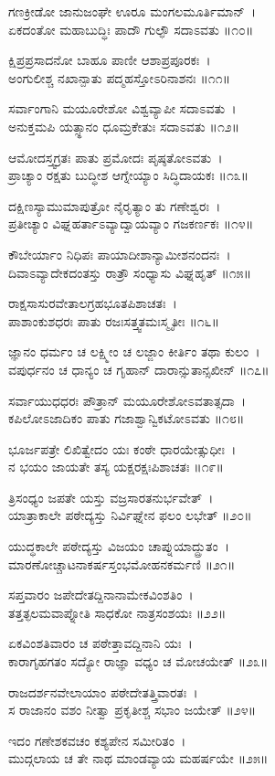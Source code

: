 ಗಣಕ್ರೀಡೋ ಜಾನುಜಂಘೇ ಊರೂ ಮಂಗಲಮೂರ್ತಿಮಾನ್~।\\
ಏಕದಂತೋ ಮಹಾಬುದ್ಧಿಃ ಪಾದೌ ಗುಲ್ಫೌ ಸದಾಽವತು ॥೧೦॥

ಕ್ಷಿಪ್ರಪ್ರಸಾದನೋ ಬಾಹೂ ಪಾಣೀ ಆಶಾಪ್ರಪೂರಕಃ~।\\
ಅಂಗುಲೀಶ್ಚ ನಖಾನ್ಪಾತು ಪದ್ಮಹಸ್ತೋಽರಿನಾಶನಃ ॥೧೧॥

ಸರ್ವಾಂಗಾನಿ ಮಯೂರೇಶೋ ವಿಶ್ವವ್ಯಾಪೀ ಸದಾಽವತು~।\\
ಅನುಕ್ತಮಪಿ ಯತ್ಸ್ಥಾನಂ ಧೂಮ್ರಕೇತುಃ ಸದಾಽವತು ॥೧೨॥

ಆಮೋದಸ್ತ್ವಗ್ರತಃ ಪಾತು ಪ್ರಮೋದಃ ಪೃಷ್ಠತೋಽವತು~।\\
ಪ್ರಾಚ್ಯಾಂ ರಕ್ಷತು ಬುದ್ಧೀಶ ಆಗ್ನೇಯ್ಯಾಂ ಸಿದ್ಧಿದಾಯಕಃ ॥೧೩॥

ದಕ್ಷಿಣಸ್ಯಾಮುಮಾಪುತ್ರೋ ನೈರೃತ್ಯಾಂ ತು ಗಣೇಶ್ವರಃ~।\\
ಪ್ರತೀಚ್ಯಾಂ ವಿಘ್ನಹರ್ತಾಽವ್ಯಾದ್ವಾಯವ್ಯಾಂ ಗಜಕರ್ಣಕಃ ॥೧೪॥

ಕೌಬೇರ್ಯಾಂ ನಿಧಿಪಃ ಪಾಯಾದೀಶಾನ್ಯಾಮೀಶನಂದನಃ~।\\
ದಿವಾಽವ್ಯಾದೇಕದಂತಸ್ತು ರಾತ್ರೌ ಸಂಧ್ಯಾಸು ವಿಘ್ನಹೃತ್ ॥೧೫॥

ರಾಕ್ಷಸಾಸುರವೇತಾಲಗ್ರಹಭೂತಪಿಶಾಚತಃ~।\\
ಪಾಶಾಂಕುಶಧರಃ ಪಾತು ರಜಃಸತ್ತ್ವತಮಃಸ್ಮೃತೀಃ ॥೧೬॥

ಜ್ಞಾನಂ ಧರ್ಮಂ ಚ ಲಕ್ಷ್ಮೀಂ ಚ ಲಜ್ಜಾಂ ಕೀರ್ತಿಂ ತಥಾ ಕುಲಂ~।\\
ವಪುರ್ಧನಂ ಚ ಧಾನ್ಯಂ ಚ ಗೃಹಾನ್ ದಾರಾನ್ಸುತಾನ್ಸಖೀನ್ ॥೧೭॥

ಸರ್ವಾಯುಧಧರಃ ಪೌತ್ರಾನ್ ಮಯೂರೇಶೋಽವತಾತ್ಸದಾ~।\\
ಕಪಿಲೋಽಜಾದಿಕಂ ಪಾತು ಗಜಾಶ್ವಾನ್ವಿಕಟೋಽವತು ॥೧೮॥

ಭೂರ್ಜಪತ್ರೇ ಲಿಖಿತ್ವೇದಂ ಯಃ ಕಂಠೇ ಧಾರಯೇತ್ಸುಧೀಃ~।\\
ನ ಭಯಂ ಜಾಯತೇ ತಸ್ಯ ಯಕ್ಷರಕ್ಷಃಪಿಶಾಚತಃ ॥೧೯॥

ತ್ರಿಸಂಧ್ಯಂ ಜಪತೇ ಯಸ್ತು ವಜ್ರಸಾರತನುರ್ಭವೇತ್~।\\
ಯಾತ್ರಾಕಾಲೇ ಪಠೇದ್ಯಸ್ತು ನಿರ್ವಿಘ್ನೇನ ಫಲಂ ಲಭೇತ್ ॥೨೦॥

ಯುದ್ಧಕಾಲೇ ಪಠೇದ್ಯಸ್ತು ವಿಜಯಂ ಚಾಪ್ನುಯಾದ್ದ್ರುತಂ~।\\
ಮಾರಣೋಚ್ಚಾಟನಾಕರ್ಷಸ್ತಂಭಮೋಹನಕರ್ಮಣಿ ॥೨೧॥

ಸಪ್ತವಾರಂ ಜಪೇದೇತದ್ದಿನಾನಾಮೇಕವಿಂಶತಿಂ~।\\
ತತ್ತತ್ಫಲಮವಾಪ್ನೋತಿ ಸಾಧಕೋ ನಾತ್ರಸಂಶಯಃ ॥೨೨॥

ಏಕವಿಂಶತಿವಾರಂ ಚ ಪಠೇತ್ತಾವದ್ದಿನಾನಿ ಯಃ~।\\
ಕಾರಾಗೃಹಗತಂ ಸದ್ಯೋ ರಾಜ್ಞಾ ವಧ್ಯಂ ಚ ಮೋಚಯೇತ್ ॥೨೩॥

ರಾಜದರ್ಶನವೇಲಾಯಾಂ ಪಠೇದೇತತ್ತ್ರಿವಾರತಃ~।\\
ಸ ರಾಜಾನಂ ವಶಂ ನೀತ್ವಾ ಪ್ರಕೃತೀಶ್ಚ ಸಭಾಂ ಜಯೇತ್ ॥೨೪॥

ಇದಂ ಗಣೇಶಕವಚಂ ಕಶ್ಯಪೇನ ಸಮೀರಿತಂ~।\\
ಮುದ್ಗಲಾಯ ಚ ತೇ ನಾಥ ಮಾಂಡವ್ಯಾಯ ಮಹರ್ಷಯೇ ॥೨೫॥

